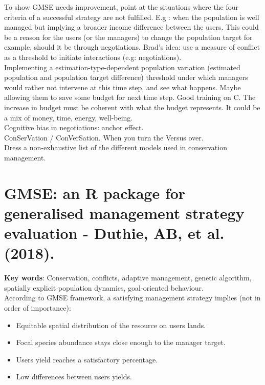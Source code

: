 \documentclass[12pt]{article}
\begin{document}
To show GMSE needs improvement, point at the situations where the four criteria of a successful strategy are not fulfilled. E.g : when the population is well managed but implying a broader income difference between the users. This could be a reason for the users (or the managers) to change the population target for example, should it be through negotiations.
Brad's idea: use a measure of conflict as a threshold to initiate interactions (e.g: negotiations).\\
Implementing a estimation-type-dependent population variation (estimated population and population target difference) threshold under which managers would rather not intervene at this time step, and see what happens.
Maybe allowing them to save some budget for next time step.
Good training on C. The increase in budget must be coherent with what the budget represents.
It could be a mix of money, time, energy, well-being.\\
Cognitive bias in negotiations: anchor effect.\\
ConSerVation / ConVerSation. When you turn the Versus over.\\
Dress a non-exhaustive list of the different models used in conservation management.

\section*{GMSE:  an  R  package  for generalised  management  strategy  evaluation - Duthie,  AB,  et al.  (2018).}

\textbf{Key words}: Conservation, conflicts, adaptive management, genetic algorithm, spatially explicit population dynamics, goal-oriented behaviour.\\

According to GMSE framework, a satisfying management strategy implies (not in order of importance):
\begin{itemize}
    \item Equitable spatial distribution of the resource on users lands.
    \item Focal species abundance stays close enough to the manager target.
    \item Users yield reaches a satisfactory percentage.
    \item Low differences between users yields.
\end{itemize}
\end{document}
